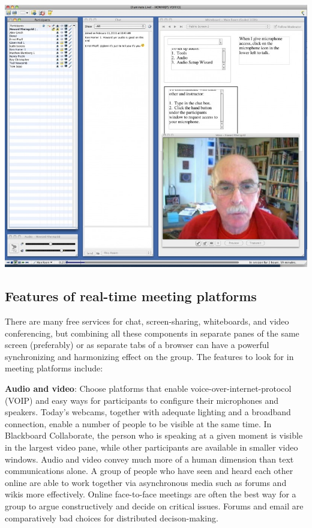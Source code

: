 {\centering
\includegraphics[width=.9\textwidth]{../pictures/elluminate.jpg}
\par}

\subsection{Features of real-time meeting platforms}

There are many free services for chat, screen-sharing, whiteboards, and
video conferencing, but combining all these components in separate panes
of the same screen (preferably) or as separate tabs of a browser can
have a powerful synchronizing and harmonizing effect on the group. The
features to look for in meeting platforms include:

\textbf{Audio and video}: Choose platforms that enable
voice-over-internet-protocol (VOIP) and easy ways for participants to
configure their microphones and speakers. Today's webcams, together with
adequate lighting and a broadband connection, enable a number of people
to be visible at the same time. In Blackboard Collaborate, the person
who is speaking at a given moment is visible in the largest video pane,
while other participants are available in smaller video windows. Audio
and video convey much more of a human dimension than text communications
alone. A group of people who have seen and heard each other online are
able to work together via asynchronous media such as forums and wikis
more effectively. Online face-to-face meetings are often the best way
for a group to argue constructively and decide on critical issues.
Forums and email are comparatively bad choices for distributed
decison-making.

